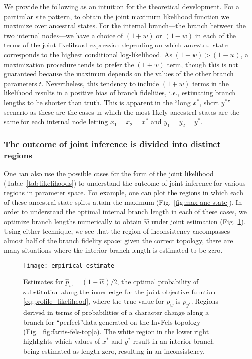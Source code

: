 \documentclass[11pt]{article}
\begin{document}
We provide the following as an intuition for the theoretical development.
For a particular site pattern, to obtain the joint maximum likelihood function we maximize over ancestral states.
For the internal branch---the branch between the two internal nodes---we have a choice of $(1+w)$ or $(1-w)$ in each of the terms of the joint likelihood expression depending on which ancestral state corresponds to the highest conditional log-likelihood.
As $(1+w) > (1-w)$, a maximization procedure tends to prefer the $(1+w)$ term, though this is not guaranteed because the maximum depends on the values of the other branch parameters $t$.
Nevertheless, this tendency to include $(1+w)$ terms in the likelihood results in a positive bias of branch fidelities, i.e., estimating branch lengths to be shorter than truth.
This is apparent in the ``long $x^*$, short $y^*$'' scenario as these are the cases in which the most likely ancestral states are the same for each internal node letting $x_1=x_2=x^*$ and $y_1=y_2=y^*$.

\subsubsection*{The outcome of joint inference is divided into distinct regions}

One can also use the possible cases for the form of the joint likelihood (Table~\ref{tab:likelihoods}) to understand the outcome of joint inference for various regions in parameter space.
For example, one can plot the regions in which each of these ancestral state splits attain the maximum (Fig.~\ref{fig:max-anc-state}).
In order to understand the optimal internal branch length in each of these cases, we optimize branch lengths numerically to obtain $\hat{w}$ under joint estimation (Fig.~\ref{fig:bl-general-inconsistency}).
Using either technique, we see that the region of inconsistency encompasses almost half of the branch fidelity space: given the correct topology, there are many situations where the interior branch length is estimated to be zero.

\begin{figure}
\centering
\texttt{[image: empirical-estimate]}
\caption{
    Estimates for $\hat{p}_w=(1-\hat{w})/2$, the optimal probability of substitution along the inner edge for the joint objective function \eqref{eq:profile_likelihood}, where the true value for $p_w$ is $p_{y^*}$.
    Regions derived in terms of probabilities of a character change along a branch for ``perfect''data generated on the InvFels topology (Fig.~\ref{fig:farris-fels-top}a).
    The white region in the lower right highlights which values of $x^*$ and $y^*$ result in an interior branch being estimated as length zero, resulting in an inconsistency.
}
\label{fig:bl-general-inconsistency}
\end{figure}
\end{document}
